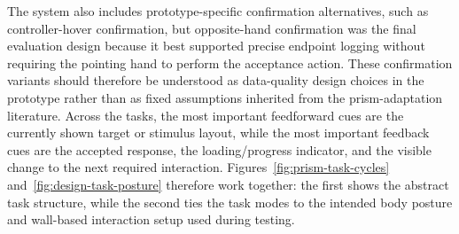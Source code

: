The system also includes prototype-specific confirmation alternatives, such as controller-hover confirmation, but opposite-hand confirmation was the final evaluation design because it best supported precise endpoint logging without requiring the pointing hand to perform the acceptance action. These confirmation variants should therefore be understood as data-quality design choices in the prototype rather than as fixed assumptions inherited from the prism-adaptation literature. Across the tasks, the most important feedforward cues are the currently shown target or stimulus layout, while the most important feedback cues are the accepted response, the loading/progress indicator, and the visible change to the next required interaction. Figures~\ref{fig:prism-task-cycles} and~\ref{fig:design-task-posture} therefore work together: the first shows the abstract task structure, while the second ties the task modes to the intended body posture and wall-based interaction setup used during testing.

